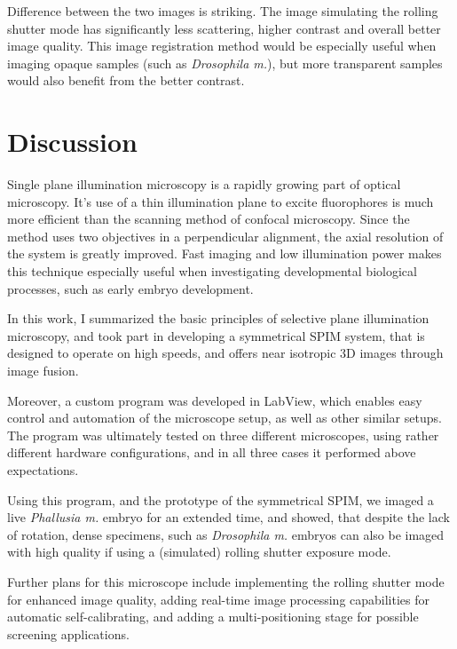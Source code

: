 \documentclass{tdk_style}
\begin{document}
Difference between the two images is striking. The image simulating the rolling shutter mode has significantly less scattering, higher contrast and overall better image quality. This image registration method would be especially useful when imaging opaque samples (such as \emph{Drosophila m.}), but more transparent samples would also benefit from the better contrast. 

\section{Discussion}
Single plane illumination microscopy is a rapidly growing part of optical microscopy. It's use of a thin illumination plane to excite fluorophores is much more efficient than the scanning method of confocal microscopy. Since the method uses two objectives in a perpendicular alignment, the axial resolution of the system is greatly improved. Fast imaging and low illumination power makes this technique especially useful when investigating developmental biological processes, such as early embryo development.

In this work, I summarized the basic principles of selective plane illumination microscopy, and took part in developing a symmetrical SPIM system, that is designed to operate on high speeds, and offers near isotropic 3D images through image fusion.

Moreover, a custom program was developed in LabView, which enables easy control and automation of the microscope setup, as well as other similar setups. The program was ultimately tested on three different microscopes, using rather different hardware configurations, and in all three cases it performed above expectations.

Using this program, and the prototype of the symmetrical SPIM, we imaged a live \textit{Phallusia m.} embryo for an extended time, and showed, that despite the lack of rotation, dense specimens, such as \textit{Drosophila m.} embryos can also be imaged with high quality if using a (simulated) rolling shutter exposure mode.

Further plans for this microscope include implementing the rolling shutter mode for enhanced image quality, adding real-time image processing capabilities for automatic self-calibrating, and adding a multi-positioning stage for possible screening applications. 
\end{document}
